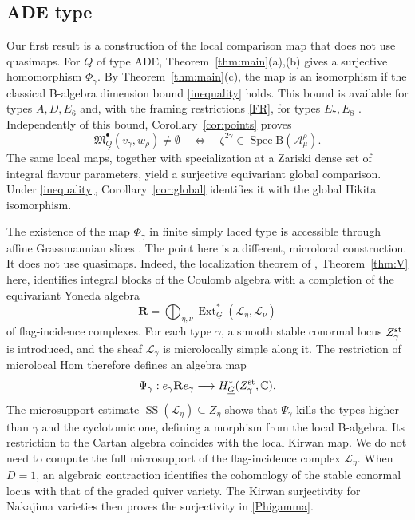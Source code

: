 \documentclass[11pt,reqno]{amsart}
\theoremstyle{definition}
\theoremstyle{remark}
\def\bbC{\mathbb C}
\def\dG{\underline G}
\def\dQ{\underline Q}
\def\B{\mathrm B}
\def\calA{\mathcal A}
\def\Spec{\operatorname{Spec}}
\def\Ext{\operatorname{Ext}}
\def\bR{\mathbf R}
\def\M{\mathfrak M}
\begin{document}
\subsection{ADE type}
Our first result is a construction of the local comparison map that
does not use quasimaps. For $Q$ of type ADE,
Theorem~\ref{thm:main}(a),(b) gives a surjective homomorphism
$ \Phi_\gamma$.
By
Theorem~\ref{thm:main}(c), the map is an isomorphism if the
classical B-algebra dimension bound \eqref{inequality} holds. This bound
is available for types $A,D,E_6$ and, with the framing restrictions
\eqref{FR}, for types $E_7,E_8$ \cite{KTWWY19a,DK25}.
Independently of this bound,
Corollary~\ref{cor:points} proves
\[
 \M_{\dQ}^\bullet(v_\gamma,w_\rho)\ne\emptyset
 \quad\Longleftrightarrow\quad
 \zeta^{2\gamma}\in\Spec\B(\calA_\mu^\rho).
\]
The same local maps, together with specialization at a Zariski dense
set of integral flavour parameters, yield a surjective equivariant
global comparison. Under \eqref{inequality},
Corollary~\ref{cor:global} identifies it with the global Hikita
isomorphism.


The existence of the map $\Phi_\gamma$ in finite simply laced
type is accessible through affine Grassmannian slices
\cite{KTWWY19a}. The point here is a different, microlocal construction. 
It does not use quasimaps.
Indeed, the localization theorem of \cite{VV25},
Theorem~\ref{thm:V} here, identifies integral blocks of the Coulomb
algebra with a completion of the equivariant Yoneda algebra
\[
 \bR=\bigoplus_{\eta,\nu}
 \Ext^*_{\dG}(\mathscr L_\eta,\mathscr L_\nu)
\]
of flag-incidence complexes. For each type
$\gamma$, a smooth stable conormal locus $Z_\gamma^{\rm st}$ is introduced,
and the sheaf $\mathscr L_\gamma$ is microlocally simple along it.
The restriction of microlocal Hom therefore defines an algebra map
\[
 \Psi_\gamma:e_\gamma\bR e_\gamma
 \longrightarrow H^*_{\dG}(Z_\gamma^{\rm st},\bbC).
\]
The microsupport estimate
$\operatorname{SS}(\mathscr L_\eta)\subseteq Z_\eta$ shows that
$\Psi_\gamma$ kills the types higher than $\gamma$ and the cyclotomic one, 
defining a morphism from the local B-algebra. Its restriction
to the Cartan algebra coincides with the local Kirwan map.
We do not need to compute the full microsupport of the flag-incidence complex $\mathscr L_\eta$.
When $D=1$, an algebraic contraction identifies the
cohomology of the stable conormal locus with that of the graded quiver
variety. The Kirwan surjectivity for Nakajima varieties
\cite{MN18} then proves the surjectivity in \eqref{Phigamma}.
\end{document}
